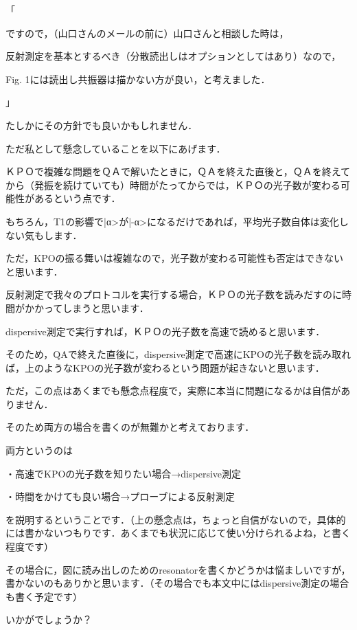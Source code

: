 「

ですので，（山口さんのメールの前に）山口さんと相談した時は，

反射測定を基本とするべき（分散読出しはオプションとしてはあり）なので，

Fig. 1には読出し共振器は描かない方が良い，と考えました．

」

 

たしかにその方針でも良いかもしれません．

 

ただ私として懸念していることを以下にあげます．

 

ＫＰＯで複雑な問題をＱＡで解いたときに，ＱＡを終えた直後と，ＱＡを終えてから（発振を続けていても）時間がたってからでは，ＫＰＯの光子数が変わる可能性があるという点です．

もちろん，T1の影響で|α>が|-α>になるだけであれば，平均光子数自体は変化しない気もします．

ただ，KPOの振る舞いは複雑なので，光子数が変わる可能性も否定はできないと思います．

 

 

反射測定で我々のプロトコルを実行する場合，ＫＰＯの光子数を読みだすのに時間がかかってしまうと思います．

dispersive測定で実行すれば，ＫＰＯの光子数を高速で読めると思います．

 

そのため，QAで終えた直後に，dispersive測定で高速にKPOの光子数を読み取れば，上のようなKPOの光子数が変わるという問題が起きないと思います．

 

ただ，この点はあくまでも懸念点程度で，実際に本当に問題になるかは自信がありません．

 

そのため両方の場合を書くのが無難かと考えております．

 

両方というのは

・高速でKPOの光子数を知りたい場合→dispersive測定

・時間をかけても良い場合→プローブによる反射測定

を説明するということです．（上の懸念点は，ちょっと自信がないので，具体的には書かないつもりです．あくまでも状況に応じて使い分けられるよね，と書く程度です）

 

その場合に，図に読み出しのためのresonatorを書くかどうかは悩ましいですが，書かないのもありかと思います．（その場合でも本文中にはdispersive測定の場合も書く予定です）

 


いかがでしょうか？
